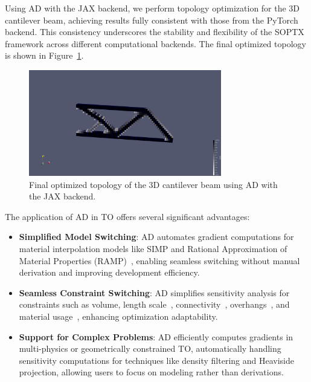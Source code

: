 \documentclass[mathpazo]{cicp}
\begin{document}
Using AD with the JAX backend, we perform topology optimization for the 3D cantilever beam, achieving results fully consistent with those from the PyTorch backend. This consistency underscores the stability and flexibility of the SOPTX framework across different computational backends. The final optimized topology is shown in Figure~\ref{fig:canti3d_ad_jax}.
\vspace{-2ex} %
\begin{figure}[htp] 
	\centering 
	\includegraphics[width=0.75\textwidth]{figures/cantilever_3d_auto_jax.png} \caption{Final optimized topology of the 3D cantilever beam using AD with the JAX backend.} \label{fig:canti3d_ad_jax} 
\end{figure}
\vspace{-2ex} %

The application of AD in TO offers several significant advantages:
\vspace{-0.5ex} %
\begin{itemize} 
	\item \textbf{Simplified Model Switching}: AD automates gradient computations for material interpolation models like SIMP and Rational Approximation of Material Properties (RAMP)~\cite{stolpe2001alternative}, enabling seamless switching without manual derivation and improving development efficiency.
	\item \textbf{Seamless Constraint Switching}: AD simplifies sensitivity analysis for constraints such as volume, length scale~\cite{guest2009imposing}, connectivity~\cite{li2016structural}, overhangs~\cite{qian2017undercut}, and material usage~\cite{sanders2018multi}, enhancing optimization adaptability.
	\item \textbf{Support for Complex Problems}: AD efficiently computes gradients in multi-physics or geometrically constrained TO, automatically handling sensitivity computations for techniques like density filtering and Heaviside projection, allowing users to focus on modeling rather than derivations.
\end{itemize}
\vspace{-0.5ex} %
\end{document}
